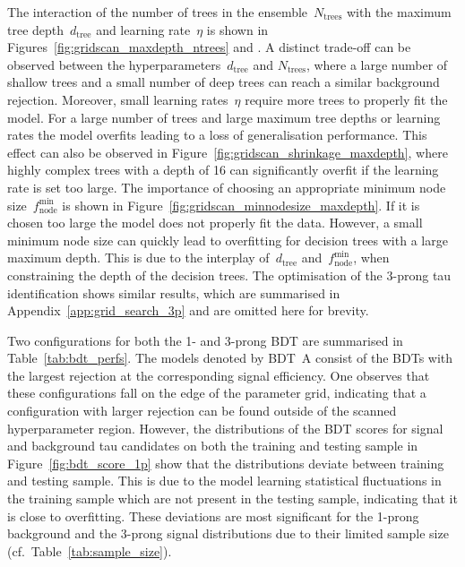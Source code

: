 The interaction of the number of trees in the ensemble~$N_\text{trees}$ with the
maximum tree depth~$d_\text{tree}$ and learning rate~$\eta$ is shown in
Figures~\ref{fig:gridscan_maxdepth_ntrees} and
. A distinct trade-off can be observed
between the hyperparameters~$d_\text{tree}$ and $N_\text{trees}$, where a large
number of shallow trees and a small number of deep trees can reach a similar
background rejection. Moreover, small learning rates~$\eta$ require more trees
to properly fit the model. For a large number of trees and large maximum tree
depths or learning rates the model overfits leading to a loss of generalisation
performance. This effect can also be observed in
Figure~\ref{fig:gridscan_shrinkage_maxdepth}, where highly complex trees with a
depth of 16 can significantly overfit if the learning rate is set too large. The
importance of choosing an appropriate minimum node
size~$f_\text{node}^\text{min}$ is shown in
Figure~\ref{fig:gridscan_minnodesize_maxdepth}. If it is chosen too large the
model does not properly fit the data. However, a small minimum node size can
quickly lead to overfitting for decision trees with a large maximum depth. This
is due to the interplay of~$d_\text{tree}$ and~$f_\text{node}^\text{min}$, when
constraining the depth of the decision trees. The optimisation of the 3-prong
tau identification shows similar results, which are summarised in
Appendix~\ref{app:grid_search_3p} and are omitted here for brevity.

Two configurations for both the 1- and 3-prong BDT are summarised in
Table~\ref{tab:bdt_perfs}. The models denoted by \mbox{BDT A} consist of the
BDTs with the largest rejection at the corresponding signal efficiency. One
observes that these configurations fall on the edge of the parameter grid,
indicating that a configuration with larger rejection can be found outside of
the scanned hyperparameter region. However, the distributions of the BDT scores
for signal and background tau candidates on both the training and testing sample
in Figure~\ref{fig:bdt_score_1p} show that the distributions deviate between
training and testing sample. This is due to the model learning statistical
fluctuations in the training sample which are not present in the testing sample,
indicating that it is close to overfitting. These deviations are most
significant for the 1-prong background and the 3-prong signal distributions due
to their limited sample size (cf.\ Table~\ref{tab:sample_size}).


